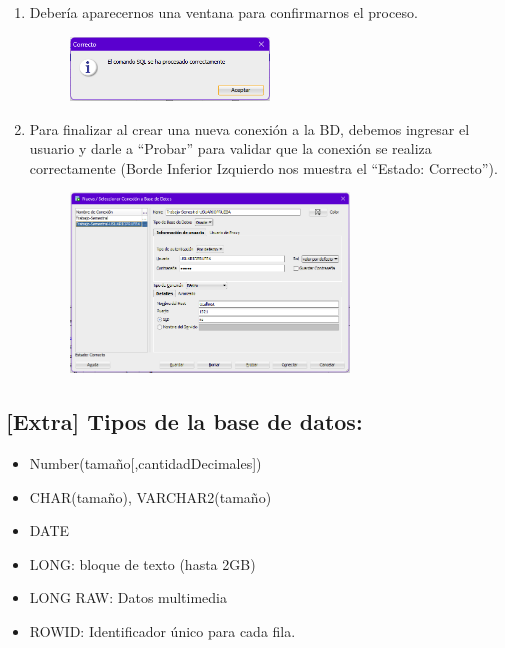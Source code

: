 \documentclass{templateNote}
\begin{document}
\begin{enumerate}
    \item Debería aparecernos una ventana para confirmarnos el proceso.
    \begin{figure}[H]
        \centering
        \includegraphics[width=0.5\textwidth]{img/image5.png}
    \end{figure}

    \item Para finalizar al crear una nueva conexión a la BD, debemos ingresar el usuario y darle a “Probar” para validar que la conexión se realiza correctamente (Borde Inferior Izquierdo nos muestra el “Estado: Correcto”).
    \begin{figure}[H]
        \centering
        \includegraphics[width=0.7\textwidth]{img/image6.png}
    \end{figure}
\end{enumerate}

\subsection{[Extra] Tipos de la base de datos:}
\begin{itemize}
    \item Number(tamaño[,cantidadDecimales])
    \item CHAR(tamaño), VARCHAR2(tamaño)
    \item DATE
    \item LONG: bloque de texto (hasta 2GB)
    \item LONG RAW: Datos multimedia
    \item ROWID: Identificador único para cada fila.
\end{itemize}
\end{document}
